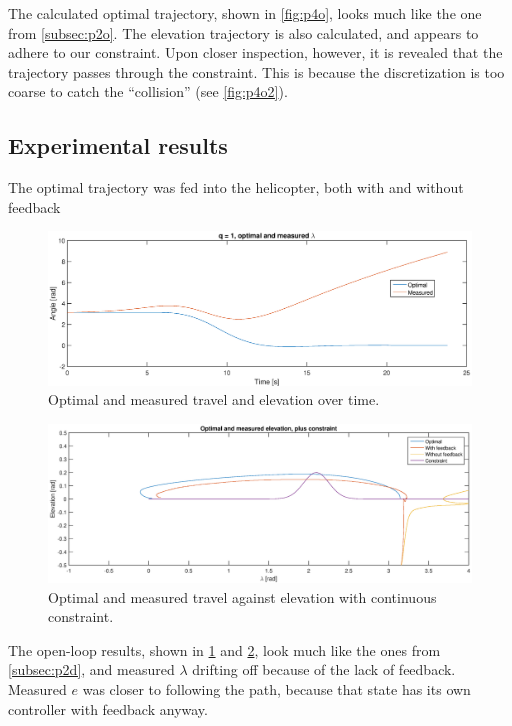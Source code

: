 The calculated optimal trajectory, shown in \cref{fig:p4o}, looks much like the one from \cref{subsec:p2o}. The elevation trajectory is also calculated, and appears to adhere to our constraint. Upon closer inspection, however, it is revealed that the trajectory passes through the constraint. This is because the discretization is too coarse to catch the ``collision'' (see \cref{fig:p4o2}).

\subsection{Experimental results}
The optimal trajectory was fed into the helicopter, both with and without feedback

\begin{figure}
    \includegraphics[width=\textwidth]{optimal_and_measured_lambda.eps}
    \caption{Optimal and measured travel and elevation over time.}
    \label{fig:p4d}
\end{figure}

\begin{figure}
    \includegraphics[width=\textwidth]{elevation_vs_lambda.eps}
    \caption{Optimal and measured travel against elevation with continuous constraint.}
    \label{fig:p4d2}
\end{figure}
The open-loop results, shown in \cref{fig:p4d} and \cref{fig:p4d2}, look much like the ones from \cref{subsec:p2d}, and measured $\lambda$ drifting off because of the lack of feedback. Measured $e$ was closer to following the path, because that state has its own controller with feedback anyway.

